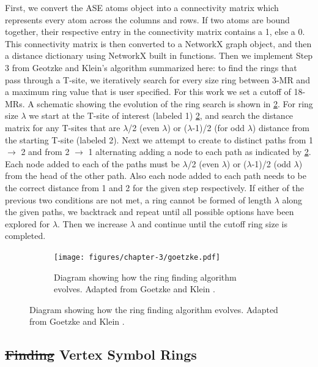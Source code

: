 \documentclass[preprint,numrefs,noinfo,sort&compress]{elsarticle}
\providecommand{\DIFdel}[1]{{\protect\color{red}\sout{#1}}}                      %
\providecommand{\DIFaddbegin}{} %
\providecommand{\DIFaddend}{} %
\providecommand{\DIFdelbegin}{} %
\providecommand{\DIFdelend}{} %
\providecommand{\DIFaddbeginFL}{} %
\providecommand{\DIFaddendFL}{} %
\providecommand{\DIFdelbeginFL}{} %
\providecommand{\DIFdelendFL}{} %
\newcommand{\DIFscaledelfig}{0.5}
\newlength{\DIFdelgraphicswidth} %
\newlength{\DIFdelgraphicsheight} %
\newcommand{\DIFaddincludegraphics}[2][]{{\color{blue}\fbox{\DIFOincludegraphics[#1]{#2}}}} %
\newcommand{\DIFdelincludegraphics}[2][]{%
\sbox{\DIFdelgraphicsbox}{\DIFOincludegraphics[#1]{#2}}%
\settoboxwidth{\DIFdelgraphicswidth}{\DIFdelgraphicsbox} %
\settoboxtotalheight{\DIFdelgraphicsheight}{\DIFdelgraphicsbox} %
\scalebox{\DIFscaledelfig}{%
\parbox[b]{\DIFdelgraphicswidth}{\usebox{\DIFdelgraphicsbox}\\[-\baselineskip] \rule{\DIFdelgraphicswidth}{0em}}\llap{\resizebox{\DIFdelgraphicswidth}{\DIFdelgraphicsheight}{%
\setlength{\unitlength}{\DIFdelgraphicswidth}%
\begin{picture}(1,1)%
\thicklines\linethickness{2pt} %
{\color[rgb]{1,0,0}\put(0,0){\framebox(1,1){}}}%
{\color[rgb]{1,0,0}\put(0,0){\line( 1,1){1}}}%
{\color[rgb]{1,0,0}\put(0,1){\line(1,-1){1}}}%
\end{picture}%
}\hspace*{3pt}}} %
} %
\DeclareRobustCommand{\DIFaddbegin}{\DIFOaddbegin \let\includegraphics\DIFaddincludegraphics} %
\DeclareRobustCommand{\DIFaddend}{\DIFOaddend \let\includegraphics\DIFOincludegraphics} %
\DeclareRobustCommand{\DIFdelbegin}{\DIFOdelbegin \let\includegraphics\DIFdelincludegraphics} %
\DeclareRobustCommand{\DIFdelend}{\DIFOaddend \let\includegraphics\DIFOincludegraphics} %
\DeclareRobustCommand{\DIFaddbeginFL}{\DIFOaddbeginFL \let\includegraphics\DIFaddincludegraphics} %
\DeclareRobustCommand{\DIFaddendFL}{\DIFOaddendFL \let\includegraphics\DIFOincludegraphics} %
\DeclareRobustCommand{\DIFdelbeginFL}{\DIFOdelbeginFL \let\includegraphics\DIFdelincludegraphics} %
\DeclareRobustCommand{\DIFdelendFL}{\DIFOaddendFL \let\includegraphics\DIFOincludegraphics} %
\begin{document}
First, we convert the ASE atoms object into a connectivity matrix which represents every atom across the columns and rows. If two atoms are bound together, their respective entry in the connectivity matrix contains a 1, else a 0. This connectivity matrix is then converted to a NetworkX graph object, and then a distance dictionary using NetworkX built in functions. Then we implement Step 3 from Geotzke and Klein's algorithm \cite{goetzke-properties-1991} summarized here: to find the rings that pass through a T-site, we iteratively search for every size ring between 3-MR and a maximum ring value that is user specified. For this work we set a cutoff of 18-MRs. A schematic showing the evolution of the ring search is shown in \cref{fig:goetzke}. For ring size \(\lambda\) we start at the T-site of interest (labeled 1) \cref{fig:goetzke}, and search the distance matrix for any T-sites that are \(\lambda\)/2 (even \(\lambda\)) or (\(\lambda\)-1)/2 (for odd \(\lambda\)) distance from the starting T-site (labeled 2). Next we attempt to create to distinct paths from 1 \(\rightarrow\) 2 and from 2 \(\rightarrow\) 1 alternating adding a node to each path as indicated by \cref{fig:goetzke}. Each node added to each of the paths must be \(\lambda\)/2 (even \(\lambda\)) or (\(\lambda\)-1)/2 (odd \(\lambda\)) from the head of the other path. Also each node added to each path needs to be the correct distance from 1 and 2 for the given step respectively. If either of the previous two conditions are not met, a ring cannot be formed of length \(\lambda\) along the given paths, we backtrack and repeat until all possible options have been explored for \(\lambda\). Then we increase \(\lambda\) and continue until the cutoff ring size is completed.

\begin{figure}
\begin{figure}[H]
\centering
\DIFdelbeginFL %
\DIFdelendFL \DIFaddbeginFL \texttt{[image: figures/chapter-3/goetzke.pdf]}
\DIFaddendFL \caption{Diagram showing how the ring finding algorithm evolves. Adapted from Goetzke and Klein \cite{goetzke-properties-1991}. \label{fig:goetzke}}
\end{figure}
\end{figure}

\subsection{\DIFdelbegin \DIFdel{Finding }\DIFdelend Vertex Symbol Rings \label{section:vertex}}
\DIFdelbegin %
\DIFdelend \DIFaddbegin \label{sec:org415adcd}
\DIFaddend 
\end{document}
